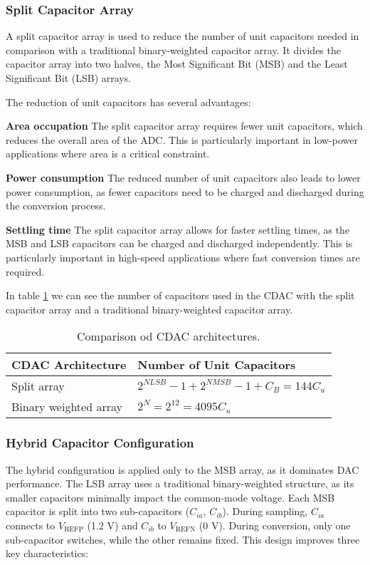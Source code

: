 \subsubsection{Split Capacitor Array}

A split capacitor array is used to reduce the number of unit capacitors needed in comparison with a traditional binary-weighted capacitor array. It divides the capacitor array into two halves, the Most Significant Bit (MSB) and the Least Significant Bit (LSB) arrays. 

The reduction of unit capacitors has several advantages:

\textbf{Area occupation}
The split capacitor array requires fewer unit capacitors, which reduces the overall area of the ADC. This is particularly important in low-power applications where area is a critical constraint.

\textbf{Power consumption}
The reduced number of unit capacitors also leads to lower power consumption, as fewer capacitors need to be charged and discharged during the conversion process.

\textbf{Settling time}
The split capacitor array allows for faster settling times, as the MSB and LSB capacitors can be charged and discharged independently. This is particularly important in high-speed applications where fast conversion times are required.

In table \ref{tab:cap-numbers} we can see the number of capacitors used in the CDAC with the split capacitor array and a traditional binary-weighted capacitor array.

\begin{table}[h]
    \centering
    \caption{Comparison od CDAC architectures.}
    \begin{tabularx}{\textwidth}{>{\centering\arraybackslash}X >{\centering\arraybackslash}X}
        \toprule
        \textbf{CDAC Architecture} & \textbf{Number of Unit Capacitors} \\
        \midrule
        Split array & $2^{NLSB} -1 + 2^{NMSB} - 1 + C_B = 144C_u$\\
        \midrule
        Binary weighted array & $2^N = 2^{12} = 4095C_u$ \\
        \bottomrule
    \end{tabularx}
    \label{tab:cap-numbers}
\end{table}

\subsubsection{Hybrid Capacitor Configuration}  
The hybrid configuration is applied only to the MSB array, as it dominates DAC performance. The LSB array uses a traditional binary-weighted structure, as its smaller capacitors minimally impact the common-mode voltage. Each MSB capacitor is split into two sub-capacitors ($C_{ia}$, $C_{ib}$). During sampling, $C_{ia}$ connects to $V_{\text{REFP}}$ (1.2 V) and $C_{ib}$ to $V_{\text{REFN}}$ (0 V). During conversion, only one sub-capacitor switches, while the other remains fixed. This design improves three key characteristics:  


